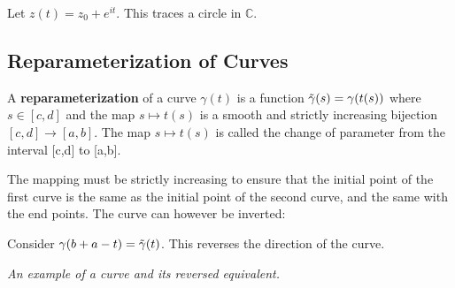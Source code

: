 \begin{example}
Let $z(t) = z_0+e^{it}$. This traces a circle in $\mathbb{C}$.
\end{example}

\subsection{Reparameterization of Curves}

\begin{definition}
A \textbf{reparameterization} of a curve $\gamma(t)$ is a function $\Tilde{\gamma}(s) = \gamma(t(s))$ where $s\in[c,d]$ and the map  $s \mapsto t(s)$ is a smooth and strictly increasing bijection $[c,d] \rightarrow [a,b]$. The map $s \mapsto t(s)$ is called the change of parameter from the interval [c,d] to [a,b]. 
\end{definition}

\begin{note}
The mapping must be strictly increasing to ensure that the initial point of the first curve is the same as the initial point of the second curve, and the same with the end points. The curve can however be inverted:
\end{note}

\begin{example}
Consider $\gamma(b+a-t) = \Tilde{\gamma}(t)$. This reverses the direction of the curve.
\end{example}


\begin{center}


\textit{An example of a curve and its reversed equivalent.}
\end{center}


